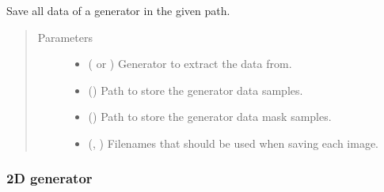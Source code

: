 \documentclass[letterpaper,10pt,english]{sphinxmanual}
\begin{document}
\begin{fulllineitems}
\label{\detokenize{data/generators/init:data.generators.check_generator_consistence}}
Save all data of a generator in the given path.
\begin{quote}\begin{description}
\item[{Parameters}] \leavevmode\begin{itemize}
\item {} 
 ( or ) \textendash{} Generator to extract the data from.

\item {} 
 () \textendash{} Path to store the generator data samples.

\item {} 
 () \textendash{} Path to store the generator data mask samples.

\item {} 
 (, ) \textendash{} Filenames that should be used when saving each image.

\end{itemize}

\end{description}\end{quote}

\end{fulllineitems}



\subsubsection{2D generator}
\label{\detokenize{data/generators/2d_generator:module-data.generators.data_2D_generator}}\label{\detokenize{data/generators/2d_generator:d-generator}}\label{\detokenize{data/generators/2d_generator::doc}}
\end{document}
